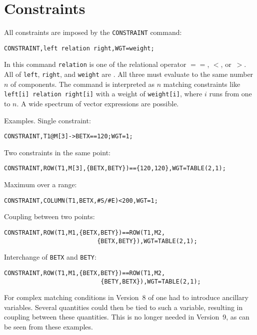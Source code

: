\section{Constraints}
\label{sec:constraint}
All constraints are imposed by the \texttt{CONSTRAINT} command:
\begin{verbatim}
CONSTRAINT,left relation right,WGT=weight;
\end{verbatim}
In this command \texttt{relation} is one of the relational operator
$==$, $<$, or~$>$. 
All of \texttt{left}, \texttt{right}, and \texttt{weight}
are .
All three must evaluate to the same number $n$ of components.
The command is interpreted as $n$ matching constraints like
\texttt{left[i] relation right[i]} with a weight of
\texttt{weight[i]}, where $i$ runs from one to $n$.
A wide spectrum of vector expressions are possible.

Examples. Single constraint:
\begin{verbatim}
CONSTRAINT,T1@M[3]->BETX==120;WGT=1;
\end{verbatim} 
Two constraints in the same point:
\begin{verbatim}
CONSTRAINT,ROW(T1,M[3],{BETX,BETY})=={120,120},WGT=TABLE(2,1);
\end{verbatim} 
Maximum over a range:
\begin{verbatim}
CONSTRAINT,COLUMN(T1,BETX,#S/#E)<200,WGT=1;
\end{verbatim} 
Coupling between two points:
\begin{verbatim}
CONSTRAINT,ROW(T1,M1,{BETX,BETY})==ROW(T1,M2,
                          {BETX,BETY}),WGT=TABLE(2,1);
\end{verbatim} 
Interchange of \texttt{BETX} and \texttt{BETY}:
\begin{verbatim}
CONSTRAINT,ROW(T1,M1,{BETX,BETY})==ROW(T1,M2,
                           {BETY,BETX}),WGT=TABLE(2,1);
\end{verbatim} 

For complex matching conditions in Version~8 of \opal one had to
introduce ancillary variables.
Several quantities could then be tied to such a variable,
resulting in coupling between these quantities.
This is no longer needed in Version~9, as can be seen from these
examples. 

